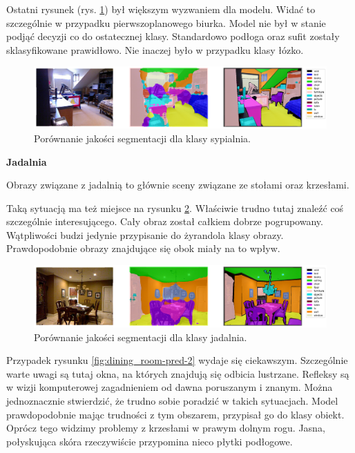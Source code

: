 Ostatni rysunek (rys. \ref{fig:bedroom-pred-3}) był większym wyzwaniem dla modelu. Widać to szczególnie w przypadku pierwszoplanowego biurka. Model nie był w stanie podjąć decyzji co do ostatecznej klasy. Standardowo podłoga oraz sufit zostały sklasyfikowane prawidłowo. Nie inaczej było w przypadku klasy łózko.
\begin{figure}[ht!]
    \centering
    \includegraphics[width=\textwidth]{img/preds_analysis/gt_vs_pred/bedroom-3.png}
    \caption{Porównanie jakości segmentacji dla klasy sypialnia.}
    \label{fig:bedroom-pred-3}
\end{figure}

\noindent
\textbf{Jadalnia}


Obrazy związane z jadalnią to głównie sceny związane ze stołami oraz krzesłami.

Taką sytuacją ma też miejsce na rysunku \ref{fig:dining_room-pred-1}. Właściwie trudno tutaj znaleźć coś szczególnie interesującego. Cały obraz został całkiem dobrze pogrupowany. Wątpliwości budzi jedynie przypisanie do żyrandola klasy obrazy. Prawdopodobnie obrazy znajdujące się obok miały na to wpływ.


\begin{figure}[ht!]
    \centering
    \includegraphics[width=\textwidth]{img/preds_analysis/gt_vs_pred/dining_room-1.png}
    \caption{Porównanie jakości segmentacji dla klasy jadalnia.}
    \label{fig:dining_room-pred-1}
\end{figure}

Przypadek rysunku \ref{fig:dining_room-pred-2} wydaje się ciekawszym. Szczególnie warte uwagi są tutaj okna, na których znajdują się odbicia lustrzane. Refleksy są w wizji komputerowej zagadnieniem od dawna poruszanym i znanym. Można jednoznacznie stwierdzić, że trudno sobie poradzić w takich sytuacjach. Model prawdopodobnie mając trudności z tym obszarem, przypisał go do klasy obiekt. Oprócz tego widzimy problemy z krzesłami w prawym dolnym rogu. Jasna, połyskująca skóra rzeczywiście przypomina nieco płytki podłogowe.

